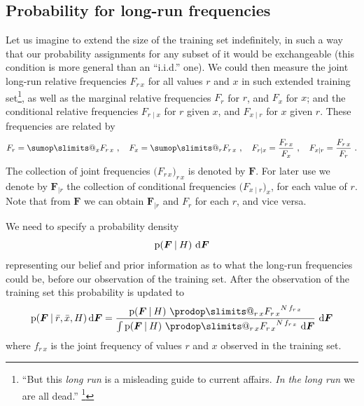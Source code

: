 \documentclass[\ifafour a4paper,12pt,\else a5paper,10pt,\fi%
onecolumn,oneside,article,%
british%
]{memoir}
\makeatletter
\theoremstyle{remark}
\theoremstyle{innote}
\def\sum{\DOTSI\sumop\slimits@}
\def\prod{\DOTSI\prodop\slimits@}
\newcommand*{\citep}{\footcites}
\newcommand*{\di}{\mathrm{d}}%
\newcommand*{\p}{\mathrm{p}}%
\renewcommand*{\|}[1][]{\nonscript\:#1\vert\nonscript\:\mathopen{}}
\renewcommand*{\=}{\TextOrMath\texteq\eq}
\newcommand*{\sect}{\S}%
\newcommand*{\q}{}%
\DeclareRobustCommand*{\q}{%
  \mathord{\mathpalette\bigcdot@{}}%
}
\newcommand*{\bigcdot@scalefactor}{0.7}
\newcommand*{\bigcdot@widthfactor}{1.5}
\newcommand*{\bigcdot@}[2]{%
  \sbox0{$#1\vcenter{}$}%
  \sbox2{$#1\cdot\m@th$}%
  \hbox to \bigcdot@widthfactor\wd2{%
    \hfil
    \raise\ht0\hbox{%
      \scalebox{\bigcdot@scalefactor}{%
        \lower\ht0\hbox{$#1\bullet\m@th$}%
      }%
    }%
    \hfil
  }%
}
\newcommand*{\rd}{\bar{r}}
\newcommand*{\xd}{\bar{x}}
\newcommand*{\yF}{\bm{F}}
\newcommand*{\yFr}{\yF_{\bm{\mid}r}}
\makeatother
\begin{document}
\subsection{Probability for long-run frequencies}
\label{sec:prob_longrun}

Let us imagine to extend the size of the training set indefinitely, in such
a way that our probability assignments for any subset of it would be
exchangeable (this condition is more general than an \enquote{i.i.d.} one).
We could then measure the joint long-run relative frequencies $F_{r\,x}$
for all values $r$ and $x$ in such extended training
set\footnote{\enquote{But this \emph{long run} is a misleading guide to
    current affairs. \emph{In the long run} we are all dead.}
  \citep[\sect~3.I, p.~65]{keynes1923_r2013}}, as well as the marginal
relative frequencies $F_{r\q}$ for $r$, and $F_{\q x}$ for $x$; and the
conditional relative frequencies $F_{r\mid x}$ for $r$ given $x$, and
$F_{x \mid r}$ for $x$ given $r$. These frequencies are related by
\begin{equation}
  \label{eq:frequencies_relations}
  F_{r\q}=\sum_{x} F_{r\,x}\ , \quad
  F_{\q x}=\sum_{r} F_{r\,x}\ ,\quad
  F_{r\mid x}=\frac{F_{r\,x}}{F_{\q x}}\ , \quad
  F_{x\mid r}=\frac{F_{r\,x}}{F_{r\q}}\ .
\end{equation}
The collection of joint frequencies $\bigl(F_{r\,x}\bigr)_{r\,x}$ is
denoted by $\yF$. For later use we denote by $\yFr$ the collection of
conditional frequencies $\bigl(F_{x\mid r}\bigr)_{x}$, for each value of
$r$. Note that from $\yF$ we can obtain $\yFr$ and $F_{r\q}$ for each $r$,
and vice versa.

\medskip

We need to specify a probability density
\begin{equation}\label{eq:prior_F}
\p(\yF \| H)\ \di\yF
\end{equation}
representing our belief and prior information as to what the long-run
frequencies could be, before our observation of the training set. After the
observation of the training set this probability is updated to
\begin{equation}
  \label{eq:post_prob_F}
  \p(\yF\|\rd,\xd, H)\,\di\yF =
  \frac{\displaystyle \p(\yF\| H)\ 
    \prod_{r\,x} {F_{r\,x}}^{N\, f_{r\,x}}
  }{\int \p(\yF\| H)\ 
       \prod_{r\,x} {F_{r\,x}}^{N\, f_{r\,x}}
              \ \di\yF
  }\ \di\yF
\end{equation}
where $f_{r\,x}$ is the joint frequency of values $r$ and $x$ observed in
the training set.
\end{document}

